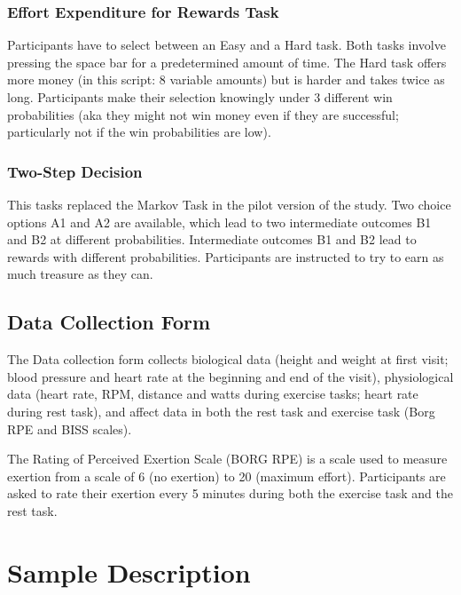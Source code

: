 \documentclass[
]{book}
\begin{document}
\subsection{Effort Expenditure for Rewards Task}\label{effort-expenditure-for-rewards-task}

Participants have to select between an Easy and a Hard task. Both tasks involve pressing the space bar for a predetermined amount of time. The Hard task offers more money (in this script: 8 variable amounts) but is harder and takes twice as long. Participants make their selection knowingly under 3 different win probabilities (aka they might not win money even if they are successful; particularly not if the win probabilities are low).

\subsection{Two-Step Decision}\label{two-step-decision}

This tasks replaced the Markov Task in the pilot version of the study. Two choice options A1 and A2 are available, which lead to two intermediate outcomes B1 and B2 at different probabilities. Intermediate outcomes B1 and B2 lead to rewards with different probabilities. Participants are instructed to try to earn as much treasure as they can.

\section{Data Collection Form}\label{data-collection-form}

The Data collection form collects biological data (height and weight at first visit; blood pressure and heart rate at the beginning and end of the visit), physiological data (heart rate, RPM, distance and watts during exercise tasks; heart rate during rest task), and affect data in both the rest task and exercise task (Borg RPE and BISS scales).

The Rating of Perceived Exertion Scale (BORG RPE) is a scale used to measure exertion from a scale of 6 (no exertion) to 20 (maximum effort). Participants are asked to rate their exertion every 5 minutes during both the exercise task and the rest task.

\chapter{Sample Description}\label{sample-description}
\end{document}

